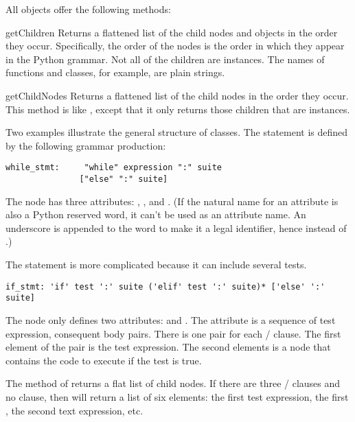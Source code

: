 \documentclass{howto}
\begin{document}
All  objects offer the following methods:

\begin{methoddesc}{getChildren}{}
  Returns a flattened list of the child nodes and objects in the
  order they occur.  Specifically, the order of the nodes is the
  order in which they appear in the Python grammar.  Not all of the
  children are  instances.  The names of functions and
  classes, for example, are plain strings.
\end{methoddesc}

\begin{methoddesc}{getChildNodes}{}
  Returns a flattened list of the child nodes in the order they
  occur.  This method is like , except that it
  only returns those children that are  instances.
\end{methoddesc}

Two examples illustrate the general structure of 
classes.  The  statement is defined by the following
grammar production: 

\begin{verbatim}
while_stmt:     "while" expression ":" suite
               ["else" ":" suite]
\end{verbatim}

The  node has three attributes: ,
, and .  (If the natural name for an
attribute is also a Python reserved word, it can't be used as an
attribute name.  An underscore is appended to the word to make it a
legal identifier, hence  instead of .)

The  statement is more complicated because it can include
several tests.  

\begin{verbatim}
if_stmt: 'if' test ':' suite ('elif' test ':' suite)* ['else' ':' suite]
\end{verbatim}

The  node only defines two attributes:  and
.  The  attribute is a sequence of test
expression, consequent body pairs.  There is one pair for each
/ clause.  The first element of the pair is
the test expression.  The second elements is a  node that
contains the code to execute if the test is true.

The  method of  returns a flat list of
child nodes.  If there are three / clauses
and no  clause, then  will return
a list of six elements: the first test expression, the first
, the second text expression, etc.
\end{document}
